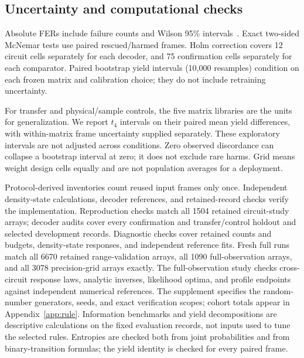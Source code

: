\subsection{Uncertainty and computational checks}
Absolute FERs include failure counts and Wilson 95\% intervals~\cite{wilson1927}.
Exact two-sided McNemar tests use paired rescued/harmed frames. Holm correction covers
12 circuit cells separately for each decoder, and 75 confirmation cells separately for
each comparator. Paired bootstrap yield intervals (10,000 resamples) condition on each frozen matrix and
calibration choice; they do not include retraining uncertainty.

For transfer and physical/sample controls, the five matrix libraries are the units for
generalization. We report $t_4$ intervals on their paired mean yield differences, with
within-matrix frame uncertainty supplied separately. These exploratory intervals are
not adjusted across conditions. Zero observed discordance can collapse a bootstrap
interval at zero; it does not exclude rare harms. Grid means weight design cells equally
and are not population averages for a deployment.

Protocol-derived inventories count reused input frames only once. Independent
density-state calculations, decoder references, and retained-record checks verify
the implementation. Reproduction checks match all 1504 retained circuit-study arrays;
decoder audits cover every confirmation and transfer/control holdout and selected
development records. Diagnostic checks cover retained counts and budgets, density-state
responses, and independent reference fits. Fresh full runs match all 6670 retained range-validation arrays, all 1090
full-observation arrays, and all 3078 precision-grid arrays exactly. The full-observation study checks cross-circuit response
laws, analytic inverses, likelihood optima, and profile endpoints against
independent numerical references. The supplement specifies the
random-number generators, seeds, and exact verification scopes; cohort totals appear
in Appendix~\ref{app:rule}. Information benchmarks and yield decompositions are
descriptive calculations on the fixed evaluation records, not inputs used to tune
the selected rules. Entropies are checked both from joint probabilities and from
binary-transition formulas; the yield identity is checked for every paired frame.


\FloatBarrier
